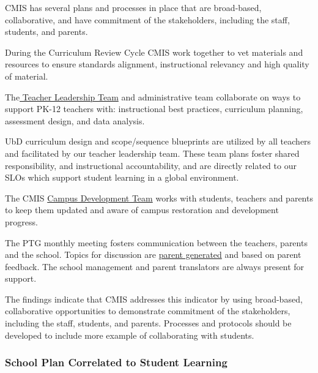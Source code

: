 \begin{findings}
CMIS has several plans and processes in place that are broad-based, collaborative, and have commitment of the stakeholders, including the staff, students, and parents.

During the Curriculum Review Cycle CMIS work together to vet materials and resources to ensure standards alignment, instructional relevancy and high quality of material.

The\href{https://docs.google.com/a/cmis.ac.th/document/d/1iW_tWIwRlWU2p0oIOvd3usDsxj9qYDt_2ROwNPBTHSc/edit?usp=sharing}{ Teacher Leadership Team}  and administrative team collaborate on ways to support PK-12 teachers with: instructional best practices, curriculum planning, assessment design, and data analysis. 

UbD curriculum design and scope/sequence blueprints are utilized by all teachers and facilitated by our teacher leadership team. These team plans foster shared responsibility, and instructional accountability, and are directly related to our SLOs which support student learning in a global environment. 

The CMIS \href{http://blogs.cmis.ac.th/campus/}{Campus Development Team} works with students, teachers and parents to keep them updated and aware of campus restoration and development progress.

The  PTG monthly meeting fosters communication between the teachers, parents and the school. Topics for discussion are \href{https://docs.google.com/a/cmis.ac.th/document/d/1kiwakkg8eKdtEexCxVNx-m1CfC3VqxhukDy8WXDPGKY/edit?usp=sharing}{parent generated} and based on parent feedback. The school management and parent translators are always present for support.

The findings indicate that CMIS addresses this indicator by using broad-based, collaborative opportunities to demonstrate commitment of the stakeholders, including the staff, students, and parents. Processes and protocols should be developed to include more example of collaborating with students.
\end{findings}

\subsubsection{School Plan Correlated to Student Learning}


